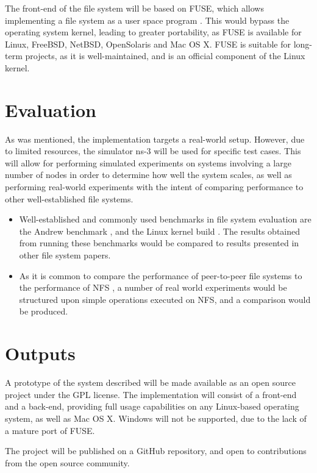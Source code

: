 \documentclass[8pt,a4paper]{article}
\begin{document}
The front-end of the file system will be based on FUSE, which allows implementing a file system as a user space program \cite{fuse}. This would bypass the operating system kernel, leading to greater portability, as FUSE is available for Linux, FreeBSD, NetBSD, OpenSolaris and Mac OS X. FUSE is suitable for long-term projects, as it is well-maintained, and is an official component of the Linux kernel.

\section{Evaluation}

As was mentioned, the implementation targets a real-world setup. However, due to limited resources, the simulator ns-3 \cite{ns3} will be used for specific test cases. This will allow for performing simulated experiments on systems involving a large number of nodes in order to determine how well the system scales, as well as performing real-world experiments with the intent of comparing performance to other well-established file systems.

\begin{itemize}
\item Well-established and commonly used benchmarks in file system evaluation are the Andrew benchmark \cite{andrew}, and the Linux kernel build \cite{kernelb}. The results obtained from running these benchmarks would be compared to results presented in other file system papers.

\item As it is common to compare the performance of peer-to-peer file systems to the performance of NFS \cite{oceanstore} \cite{ivy} \cite{pastis}, a number of real world experiments would be structured upon simple operations executed on NFS, and a comparison would be produced.
\end{itemize}

\section{Outputs}

A prototype of the system described will be made available as an open source project under the GPL \cite{gpl} license. The implementation will consist of a front-end and a back-end, providing full usage capabilities on any Linux-based operating system, as well as Mac OS X. Windows will not be supported, due to the lack of a mature port of FUSE. 

The project will be published on a GitHub \cite{github} repository, and open to contributions from the open source community.
\end{document}
